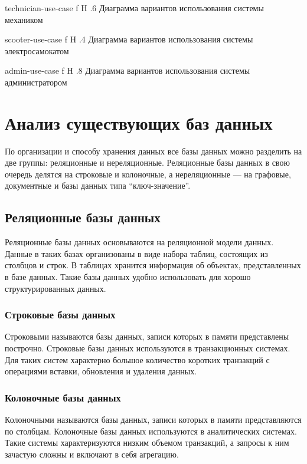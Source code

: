 {technician-use-case}
{f}
{H}
{.6\textwidth}
{Диаграмма вариантов использования системы механиком}

{scooter-use-case}
{f}
{H}
{.4\textwidth}
{Диаграмма вариантов использования системы электросамокатом}

{admin-use-case}
{f}
{H}
{.8\textwidth}
{Диаграмма вариантов использования системы администратором}

\section{Анализ существующих баз данных}

По организации и способу хранения данных все базы данных можно разделить на две группы: реляционные и нереляционные. Реляционные базы данных в свою очередь делятся на строковые и колоночные, а нереляционные --- на графовые, документные и базы данных типа \enquote{ключ-значение}.

\subsection*{Реляционные базы данных}

Реляционные базы данных основываются на реляционной модели данных. Данные в таких базах организованы в виде набора таблиц, состоящих из столбцов и строк. В таблицах хранится информация об объектах, представленных в базе данных. Такие базы данных удобно использовать для хорошо структурированных данных.

\subsubsection{Строковые базы данных}

Строковыми называются базы данных, записи которых в памяти представлены построчно. Строковые базы данных используются в транзакционных системах. Для таких систем характерно большое количество коротких транзакций с операциями вставки, обновления и удаления данных.

\subsubsection{Колоночные базы данных}

Колоночными называются базы данных, записи которых в памяти представляются по столбцам. Колоночные базы данных используются в аналитических системах. Такие системы характеризуются низким объемом транзакций, а запросы к ним зачастую сложны и включают в себя агрегацию.

